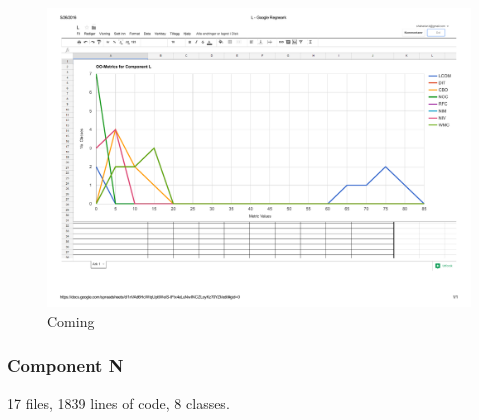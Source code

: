 \begin{landscape}
\setlength\LTleft{-.5in}
	\begin{figure}
	\label{fig:loggraph}
	\caption{Coming}
	\centering
	\includegraphics[width=\textwidth]{images/log.pdf}
	\end{figure}
\end{landscape}







\subsubsection{Component N}
17 files, 1839 lines of code, 8 classes.

